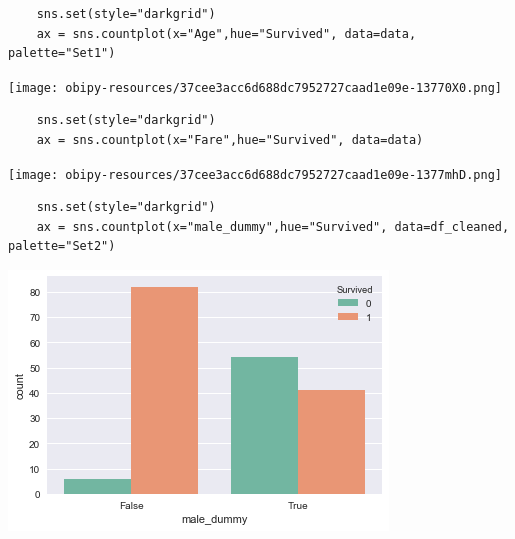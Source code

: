 \documentclass[11pt]{article}
\begin{document}
\begin{verbatim}
    sns.set(style="darkgrid")
    ax = sns.countplot(x="Age",hue="Survived", data=data, palette="Set1")
\end{verbatim}

\begin{center}
\texttt{[image: obipy-resources/37cee3acc6d688dc7952727caad1e09e-13770X0.png]}
\end{center}

\begin{verbatim}
    sns.set(style="darkgrid")
    ax = sns.countplot(x="Fare",hue="Survived", data=data)
\end{verbatim}

\begin{center}
\texttt{[image: obipy-resources/37cee3acc6d688dc7952727caad1e09e-1377mhD.png]}
\end{center}

\begin{verbatim}
    sns.set(style="darkgrid")
    ax = sns.countplot(x="male_dummy",hue="Survived", data=df_cleaned, palette="Set2")
\end{verbatim}

\begin{center}
\includegraphics[width=.9\linewidth]{obipy-resources/37cee3acc6d688dc7952727caad1e09e-1377zrJ.png}
\end{center}
\end{document}
